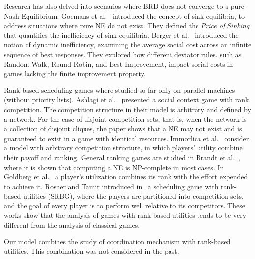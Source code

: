 Research has also delved into scenarios where BRD does not converge to a pure Nash Equilibrium.
Goemans et al.~\cite{GMV05} introduced the concept of sink equilibria, to address situations where pure NE do not exist. They defined the {\em Price of Sinking} that quantifies the inefficiency of sink equilibria. %
%
Berger et al.~\cite{BFNR11} introduced the notion of dynamic inefficiency, examining the average social cost across an infinite sequence of best responses. They explored how different deviator rules, such as Random Walk, Round Robin, and Best Improvement, impact social costs in games lacking the finite improvement property.


Rank-based scheduling games where studied so far only on parallel machines (without priority lists). Ashlagi et al.~\cite{AKT08} presented a social context game with rank competition. The competition structure in their model is arbitrary and defined by a network. For the case of disjoint competition sets, that is, when the network is a collection of disjoint cliques, the paper shows that a NE may not exist and is guaranteed to exist in a game with identical resources. Immorlica et al.~\cite{ILMS09} consider a model with arbitrary competition structure, in which players' utility combine their payoff and ranking. General ranking games are studied in Brandt et al.~\cite{BFHS09}, where it is shown that computing a NE is NP-complete in most cases. In Goldberg et al.~\cite{GGKV13} a player's utilization combines its rank with the effort expended to achieve it. Rosner and Tamir introduced in~\cite{RT23} a scheduling game with rank-based utilities (SRBG), where the players are partitioned into competition sets, and the goal of every player is to perform well relative to its competitors. These works show that the analysis of games with rank-based utilities tends to be very different from the analysis of classical games.

Our model combines the study of coordination mechanism with rank-based utilities. This combination was not considered in the past.

